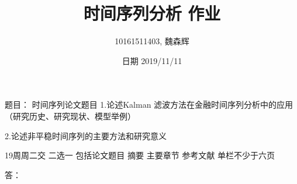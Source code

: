 \documentclass[12pt, a4paper]{ctexart}
\title{时间序列分析 作业}
\author{10161511403, 魏森辉}
\date{日期 2019/11/11}
\begin{document}
\maketitle{}


\begin{flushleft}
\qquad 题目：
时间序列论文题目
1.论述Kalman 滤波方法在金融时间序列分析中的应用
（研究历史、研究现状、模型举例）

2.论述非平稳时间序列的主要方法和研究意义

19周周二交
二选一
包括论文题目 摘要 主要章节 参考文献
单栏不少于六页

\qquad 答：

\end{flushleft}
\end{document}
